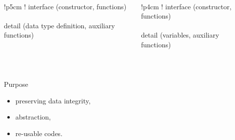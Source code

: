 \begin{frame}
\begin{columns}
 \begin{column}{.5\linewidth}
  \noindent{}\\
\begin{tabular}{
!{\color{red!70!black}\vrule width 1pt}p{5cm}
!{\color{red!70!black}\vrule width 1pt}} 
 interface {\tiny (constructor, functions)} \\ \hline \\
 detail {\tiny (\alert{data type definition}, auxiliary functions)}   
\end{tabular}
 \end{column}
\begin{column}{.5\linewidth}
  \noindent{}\\
\begin{tabular}{
!{\color{red!70!black}\vrule width 1pt}p{4cm}
!{\color{red!70!black}\vrule width 1pt}} 
 interface {\tiny (constructor, functions)}\\ \hline \\
 detail {\tiny (\alert{variables}, auxiliary functions)}   
\end{tabular}
\end{column}
\end{columns}
\ \\[2em]
\begin{block}{Purpose}
\begin{itemize}
 \item preserving data integrity, 
 \item abstraction, 
 \item re-usable codes.
\end{itemize}
\end{block}
\frametitle{\ }
\end{frame}

